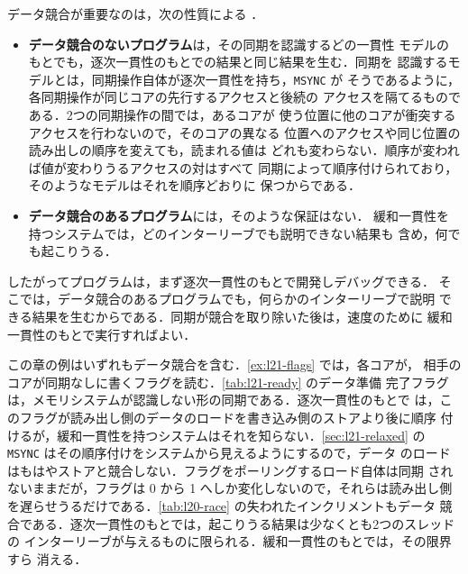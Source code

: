 \documentclass[../main.tex]{subfiles}
\begin{document}
データ競合が重要なのは，次の性質による \cite{adve1990}．
\begin{itemize}
  \item \textbf{データ競合のないプログラム}は，その同期を認識するどの一貫性
    モデルのもとでも，逐次一貫性のもとでの結果と同じ結果を生む．同期を
    認識するモデルとは，同期操作自体が逐次一貫性を持ち，\texttt{MSYNC} が
    そうであるように，各同期操作が同じコアの先行するアクセスと後続の
    アクセスを隔てるものである．2つの同期操作の間では，あるコアが
    使う位置に他のコアが衝突するアクセスを行わないので，そのコアの異なる
    位置へのアクセスや同じ位置の読み出しの順序を変えても，読まれる値は
    どれも変わらない．順序が変われば値が変わりうるアクセスの対はすべて
    同期によって順序付けられており，そのようなモデルはそれを順序どおりに
    保つからである．
  \item \textbf{データ競合のあるプログラム}には，そのような保証はない．
    緩和一貫性を持つシステムでは，どのインターリーブでも説明できない結果も
    含め，何でも起こりうる．
\end{itemize}

したがってプログラムは，まず逐次一貫性のもとで開発しデバッグできる．
そこでは，データ競合のあるプログラムでも，何らかのインターリーブで説明
できる結果を生むからである．同期が競合を取り除いた後は，速度のために
緩和一貫性のもとで実行すればよい．

この章の例はいずれもデータ競合を含む．\cref{ex:l21-flags} では，各コアが，
相手のコアが同期なしに書くフラグを読む．\cref{tab:l21-ready} のデータ準備
完了フラグは，メモリシステムが認識しない形の同期である．逐次一貫性のもとで
は，このフラグが読み出し側のデータのロードを書き込み側のストアより後に順序
付けるが，緩和一貫性を持つシステムはそれを知らない．\cref{sec:l21-relaxed}
の \texttt{MSYNC} はその順序付けをシステムから見えるようにするので，データ
のロードはもはやストアと競合しない．フラグをポーリングするロード自体は同期
されないままだが，フラグは 0 から 1 へしか変化しないので，それらは読み出し側
を遅らせうるだけである．\cref{tab:l20-race} の失われたインクリメントもデータ
競合である．逐次一貫性のもとでは，起こりうる結果は少なくとも2つのスレッドの
インターリーブが与えるものに限られる．緩和一貫性のもとでは，その限界すら
消える．
\end{document}
